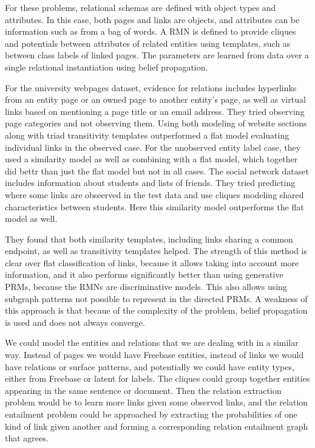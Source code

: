 \documentclass{article}
\begin{document}
For these problems, relational schemas are defined with object types and attributes. In this case, both pages and links are objects, and attributes can be information such as from a bag of words. A RMN is defined to provide cliques and potentials between attributes of related entities using templates, such as between class labels of linked pages. The parameters are learned from data over a single relational instantiation using belief propagation. 

For the university webpages dataset, evidence for relations includes hyperlinks from an entity page or an owned page to another entity's page, as well as virtual links based on mentioning a page title or an email address. They tried observing page categories and not observing them. Using both modeling of website sections along with triad transitivity templates outperformed a flat model evaluating individual links in the observed case. For the unobserved entity label case, they used a similarity model as well as combining with a flat model, which together did bettr than just the flat model but not in all cases. The social network dataset includes information about students and lists of friends. They tried predicting where some links are obseerved in the test data and use cliques modeling shared characteristics between students. Here this similarity model outperforms the flat model as well.

They found that both similarity templates, including links sharing a common endpoint, as well as transitivity templates helped. The strength of this method is clear over flat classification of links, because it allows taking into account more information, and it also performs significantly better than using generative PRMs, because the RMNs are discriminative models. This also allows using subgraph patterns not possible to represent in the directed PRMs. A weakness of this approach is that becaue of the complexity of the problem, belief propagation is used and does not always converge.

We could model the entities and relations that we are dealing with in a similar way. Instead of pages we would have Freebase entities, instead of links we would have relations or surface patterns, and potentially we could have entity types, either from Freebase or latent for labels. The cliques could group together entities appearing in the same sentence or document. Then the relation extraction problem would be to learn more links given some observed links, and the relation entailment problem could be approached by extracting the probabilities of one kind of link given another and forming a corresponding relation entailment graph that agrees. 



\end{document}
